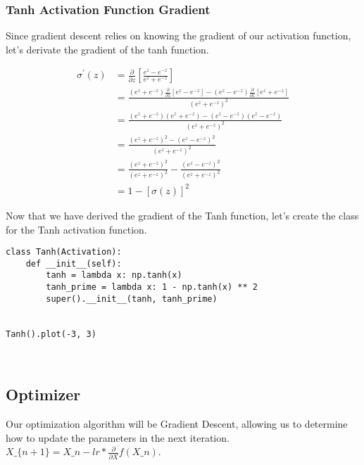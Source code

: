 \documentclass[openany]{book}
\begin{document}
    \subsubsection{Tanh Activation Function
Gradient}\label{tanh-activation-function-gradient}

Since gradient descent relies on knowing the gradient of our activation
function, let's derivate the gradient of the tanh function.

\begin{align*}
\sigma^\prime(z) &= \frac{\partial}{\partial z} [ \frac{e^z-e^{-z}}{e^z+e^{-z}} ] \\
&= \frac{(e^z+e^{-z})\frac{\partial}{\partial z}[e^z-e^{-z}] - (e^z-e^{-z})\frac{\partial}{\partial z}[e^z+e^{-z}]}{({e^z+e^{-z}})^2} \\
&= \frac{(e^z+e^{-z})(e^z+e^{-z}) - (e^z-e^{-z})(e^z-e^{-z})}{({e^z+e^{-z}})^2} \\
&= \frac{(e^z+e^{-z})^2 - (e^z-e^{-z})^2}{({e^z+e^{-z}})^2} \\
&= \frac{(e^z+e^{-z})^2}{({e^z+e^{-z}})^2} - \frac{(e^z-e^{-z})^2}{({e^z+e^{-z}})^2} \\
&= 1 - [\sigma(z)]^2
\end{align*}

    Now that we have derived the gradient of the Tanh function, let's create
the class for the Tanh activation function.

\begin{tcolorbox}
\tiny
\begin{verbatim}
class Tanh(Activation):
    def __init__(self):
        tanh = lambda x: np.tanh(x)
        tanh_prime = lambda x: 1 - np.tanh(x) ** 2
        super().__init__(tanh, tanh_prime)


Tanh().plot(-3, 3)
\end{verbatim}
\end{tcolorbox}

    \begin{center}
    \end{center}
    { \hspace*{\fill} \\}
    
    \subsection{Optimizer}\label{optimizer}

Our optimization algorithm will be Gradient Descent, allowing us to
determine how to update the parameters in the next iteration.
$ X\_\{n+1\} = X\_n - lr * \frac{\partial}{\partial X} f(X\_n)$.
\end{document}
